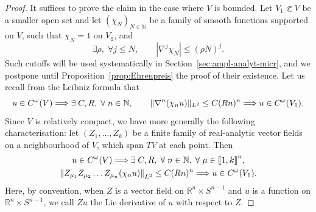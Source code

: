 \documentclass[AHL,Unicode,longabstracts,published]{cedram}
\makeatletter
\newcommand\1{\mathds{1}}
\newcommand{\R}{\mathbb{R}}
\newcommand{\N}{\mathbb{N}}
\let\save@mathaccent\mathaccent
\newcommand*\if@single[3]{%
  \setbox0\hbox{${\mathaccent"0362{#1}}^H$}%
  \setbox2\hbox{${\mathaccent"0362{\kern0pt#1}}^H$}%
  \ifdim\ht0=\ht2 #3\else #2\fi
  }
\newcommand*\rel@kern[1]{\kern#1\dimexpr\macc@kerna}
\newcommand*\widebar[1]{\@ifnextchar^{{\wide@bar{#1}{0}}}{\wide@bar{#1}{1}}}
\newcommand*\wide@bar[2]{\if@single{#1}{\wide@bar@{#1}{#2}{1}}{\wide@bar@{#1}{#2}{2}}}
\newcommand*\wide@bar@[3]{%
  \begingroup
  \def\mathaccent##1##2{%
    \let\mathaccent\save@mathaccent
    \if#32 \let\macc@nucleus\first@char \fi
    \setbox\z@\hbox{$\macc@style{\macc@nucleus}_{}$}%
    \setbox\tw@\hbox{$\macc@style{\macc@nucleus}{}_{}$}%
    \dimen@\wd\tw@
    \advance\dimen@-\wd\z@
    \divide\dimen@ 3
    \@tempdima\wd\tw@
    \advance\@tempdima-\scriptspace
    \divide\@tempdima 10
    \advance\dimen@-\@tempdima
    \ifdim\dimen@>\z@ \dimen@0pt\fi
    \rel@kern{0.6}\kern-\dimen@
    \if#31
      \overline{\rel@kern{-0.6}\kern\dimen@\macc@nucleus\rel@kern{0.4}\kern\dimen@}%
      \advance\dimen@0.4\dimexpr\macc@kerna
      \let\final@kern#2%
      \ifdim\dimen@<\z@ \let\final@kern1\fi
      \if\final@kern1 \kern-\dimen@\fi
    \else
      \overline{\rel@kern{-0.6}\kern\dimen@#1}%
    \fi
  }%
  \macc@depth\@ne
  \let\math@bgroup\@empty \let\math@egroup\macc@set@skewchar
  \mathsurround\z@ \frozen@everymath{\mathgroup\macc@group\relax}%
  \macc@set@skewchar\relax
  \let\mathaccentV\macc@nested@a
  \if#31
    \macc@nested@a\relax111{#1}%
  \else
    \def\gobble@till@marker##1\endmarker{}%
    \futurelet\first@char\gobble@till@marker#1\endmarker
    \ifcat\noexpand\first@char A\else
      \def\first@char{}%
    \fi
    \macc@nested@a\relax111{\first@char}%
  \fi
  \endgroup
}
\let\oldbar\bar
\renewcommand*{\bar}[1]{{\mathchoice{\widebar{#1}}{\widebar{#1}}{\widebar{#1}}{\oldbar{#1}}}}
\let\oldexists\exists
\renewcommand*{\exists}{\mathrel{\oldexists}}
\let\oldforall\forall
\renewcommand*{\forall}{\mathrel{\oldforall}}
\newcommand{\llbracket}{\mathopen{[\mkern -2.7mu[}}
\newcommand{\rrbracket}{\mathclose{]\mkern -2.7mu]}}
\renewcommand*{\implies}{\mathchoice{\Longrightarrow}{\Rightarrow}{\Rightarrow}{\Rightarrow}}
\let\originalleft\left
\let\originalright\right
\renewcommand{\left}{\mathopen{}\mathclose\bgroup\originalleft}
\renewcommand{\right}{\aftergroup\egroup\originalright}
\makeatother
\begin{document}
\begin{proof}
It suffices to prove the claim in the case where $V$ is bounded. Let $V_1\Subset V$ be a smaller open set and let $(\chi_N)_{N\in \N}$ be a family of smooth functions supported on $V$, such that $\chi_N=1$ on $V_1$, and
\[
\exists \rho, \;\forall j\leq N,\qquad |\nabla^j\chi_N|\leq (\rho N)^j.
\]
Such cutoffs will be used systematically in Section~\ref{sec:ampl-analyt-micr}, and we postpone until Proposition~\ref{prop:Ehrenpreis} the proof of their existence. Let us recall from the Leibniz formula that
\[
u\in C^{\omega}(V)\implies \; \exists C,R,\; \forall n\in \N,\qquad \|\nabla^n(\chi_nu)\|_{L^2}\leq C(Rn)^n\implies u\in C^{\omega}(V_1).
\]
Since $V$ is relatively compact, we have more generally the following characterisation: let $(Z_1,\dots,Z_k)$ be a finite family of real-analytic vector fields on a neighbourhood of $V$, which span $TV$ at each point. Then
\begin{multline*}
u\in C^{\omega}(V)\implies \;\exists C,R,\;\forall n\in \N, \;\forall \mu\in
\llbracket 1,k\rrbracket^n,\\
\left\|Z_{\mu_1}Z_{\mu_2}\dots Z_{\mu_n}(\chi_nu)\right\|_{L^2}\leq C(Rn)^n\implies u\in C^{\omega}(V_1).
\end{multline*}
Here, by convention, when $Z$ is a vector field on $\R^n\times S^{n-1}$ and $u$ is a function on $\R^n\times S^{n-1}$, we call $Zu$ the Lie derivative of $u$ with respect to $Z$.


\end{proof}
\end{document}
